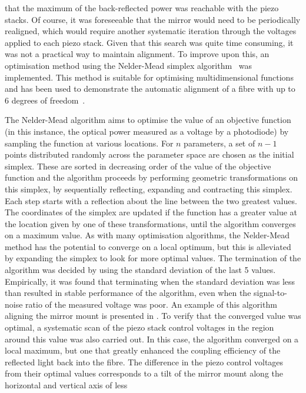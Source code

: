 that the maximum of the back-reflected power was reachable with the piezo
stacks. Of course, it was foreseeable that the mirror would need to be
periodically realigned, which would require another systematic iteration through
the voltages applied to each piezo stack. Given that this search was quite time
consuming, it was not a practical way to maintain alignment. To improve upon
this, an optimisation method using the Nelder-Mead simplex
algorithm~\cite{Nelder1965} was implemented. This method is suitable for
optimising multidimensional functions and has been used to demonstrate the
automatic alignment of a fibre with up to 6 degrees of freedom~\cite{Zhang2004}.
\par\noindent
The Nelder-Mead algorithm aims to optimise the value of an objective
function (in this instance, the optical power measured as a voltage by a
photodiode) by sampling the function at various locations. For \(n\) parameters,
a set of \(n-1\) points distributed randomly across the parameter space are
chosen as the initial simplex. These are sorted in decreasing order of the value
of the objective function and the algorithm proceeds by performing geometric
transformations on this simplex, by sequentially reflecting, expanding and
contracting this simplex. Each step starts with a reflection about the line
between the two greatest values. The coordinates of the simplex are updated if
the function has a greater value at the location given by one of these
transformations, until the algorithm converges on a maximum value. As with many
optimisation algorithms, the Nelder-Mead method has the potential to converge on
a local optimum, but this is alleviated by expanding the simplex to look for
more optimal values. The termination of the algorithm was decided by using the
standard deviation of the last 5 values. Empirically, it was found that
terminating when the standard deviation was less than 
resulted in stable performance of the algorithm, even when the signal-to-noise
ratio of the measured voltage was poor. An example of this algorithm aligning
the mirror mount is presented in . To verify
that the converged value was optimal, a systematic scan of the piezo stack
control voltages in the region around this value was also carried out. In this
case, the algorithm converged on a local maximum, but one that greatly enhanced
the coupling efficiency of the reflected light back into the fibre. The
difference in the piezo control voltages from their optimal values corresponds
to a tilt of the mirror mount along the horizontal and vertical axis of less
